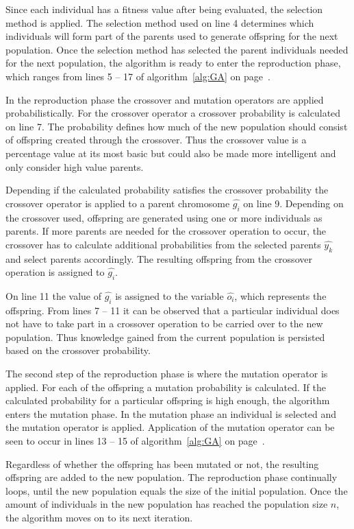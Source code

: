 Since each individual has a fitness value after being evaluated, the selection method is applied. The selection method used on line 4 determines which individuals will form part of the parents used to generate offspring for the next population. Once the selection method has selected the parent individuals needed for the next population, the algorithm is ready to enter the reproduction phase, which ranges from lines 5 -- 17 of algorithm~\ref{alg:GA} on page~\pageref{alg:GA}.

In the reproduction phase the crossover and mutation operators are applied probabilistically. For the crossover operator a crossover probability is calculated on line 7. The probability defines how much of the new population should consist of offspring created through the crossover. Thus the crossover value is a percentage value at its most basic but could also be made more intelligent and only consider high value parents. 

Depending if the calculated probability satisfies the crossover probability the crossover operator is applied to a parent chromosome $\hat{g_i}$ on line 9. Depending on the crossover used, offspring are generated using one or more individuals as parents. If more parents are needed for the crossover operation to occur, the crossover has to calculate additional probabilities from the selected parents $\hat{y_k}$ and select parents accordingly. The resulting offspring from the crossover operation is assigned to $\hat{g_i}$.

On line 11 the value of $\hat{g_i}$ is assigned to the variable $\hat{o_i}$, which represents the offspring. From lines 7 -- 11 it can be observed that a particular individual does not have to take part in a crossover operation to be carried over to the new population. Thus knowledge gained from the current population is persisted based on the crossover probability.

The second step of the reproduction phase is where the mutation operator is applied. For each of the offspring a mutation probability is calculated. If the calculated probability for a particular offspring is high enough, the algorithm enters the mutation phase. In the mutation phase an individual is selected and the mutation operator is applied. Application of the mutation operator can be seen to occur in lines 13 -- 15 of algorithm~\ref{alg:GA} on page~\pageref{alg:GA}.

Regardless of whether the offspring has been mutated or not, the resulting offspring are added to the new population. The reproduction phase continually loops, until the new population equals the size of the initial population. Once the amount of individuals in the new population has reached the population size $n$, the algorithm moves on to its next iteration.

